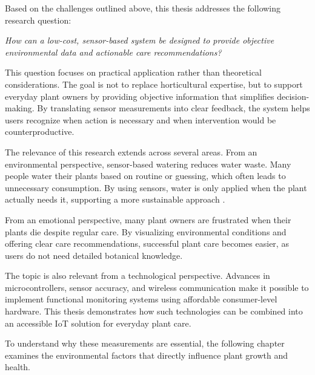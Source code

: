 Based on the challenges outlined above, this thesis addresses the following research question:

\textit{How can a low-cost, sensor-based system be designed to provide objective environmental data and actionable care recommendations?}

This question focuses on practical application rather than theoretical considerations. The goal is not to replace horticultural expertise, but to support everyday plant owners by providing objective information that simplifies decision-making. By translating sensor measurements into clear feedback, the system helps users recognize when action is necessary and when intervention would be counterproductive.

The relevance of this research extends across several areas. From an environmental perspective, sensor-based watering reduces water waste. Many people water their plants based on routine or guessing, which often leads to unnecessary consumption. By using sensors, water is only applied when the plant actually needs it, supporting a more sustainable approach \cite{faoWaterSustainableFood,worldbankFreshwater70}.

From an emotional perspective, many plant owners are frustrated when their plants die despite regular care. By visualizing environmental conditions and offering clear care recommendations, successful plant care becomes easier, as users do not need detailed botanical knowledge.

The topic is also relevant from a technological perspective. Advances in microcontrollers, sensor accuracy, and wireless communication make it possible to implement functional monitoring systems using affordable consumer-level hardware. This thesis demonstrates how such technologies can be combined into an accessible IoT solution for everyday plant care.

To understand why these measurements are essential, the following chapter examines the environmental factors that directly influence plant growth and health.
